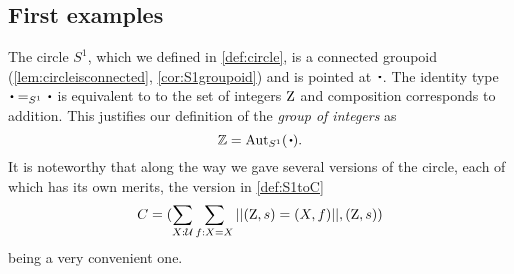 \subsection{First examples}
\label{sec:firstgroupexamples}
   \begin{example}\label{excirclegroup}
   The circle $S^1$, which we defined in \cref{def:circle}, is a connected groupoid (\cref{lem:circleisconnected}, \cref{cor:S1groupoid}) and is pointed at $\base$. The identity type $\base=_{S^1}\base$ is equivalent to to the set of integers $\mathrm{Z}$ and composition corresponds to addition.  This justifies our definition of the \emph{group of integers} as 
$$\ZZ=\aut_{S^1}(\base).$$
It is noteworthy that along the way we gave several versions of the circle, each of which has its own merits, the version in \cref{def:S1toC}
$$C=(\sum_{X:\mathcal{U}}\sum_{f:X=X}||(\mathrm{Z},s)=(X,f)||, (\mathrm{Z},s))$$
being a very convenient one.
 \end{example}

